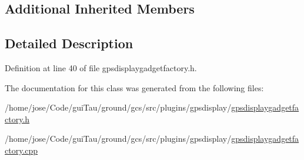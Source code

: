 \subsection*{Additional Inherited Members}


\subsection{Detailed Description}


Definition at line 40 of file gpsdisplaygadgetfactory.\-h.



The documentation for this class was generated from the following files\-:\begin{DoxyCompactItemize}
\item 
/home/jose/\-Code/gui\-Tau/ground/gcs/src/plugins/gpsdisplay/\hyperlink{gpsdisplaygadgetfactory_8h}{gpsdisplaygadgetfactory.\-h}\item 
/home/jose/\-Code/gui\-Tau/ground/gcs/src/plugins/gpsdisplay/\hyperlink{gpsdisplaygadgetfactory_8cpp}{gpsdisplaygadgetfactory.\-cpp}\end{DoxyCompactItemize}
